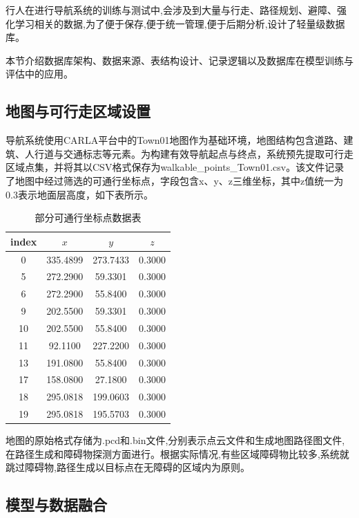 行人在进行导航系统的训练与测试中,会涉及到大量与行走、路径规划、避障、强化学习相关的数据,为了便于保存,便于统一管理,便于后期分析,设计了轻量级数据库。

本节介绍数据库架构、数据来源、表结构设计、记录逻辑以及数据库在模型训练与评估中的应用。

\subsection{地图与可行走区域设置}

导航系统使用CARLA平台中的Town01地图作为基础环境，地图结构包含道路、建筑、人行道与交通标志等元素。为构建有效导航起点与终点，系统预先提取可行走区域点集，并将其以CSV格式保存为walkable\_points\_Town01.csv。该文件记录了地图中经过筛选的可通行坐标点，字段包含x、y、z三维坐标，其中z值统一为0.3表示地面层高度，如下表所示。

\begin{table}[H]
    \centering
    \caption{部分可通行坐标点数据表}
    \label{tab:coord_data}
    \begin{tabular}{cccc}
        \toprule
        index & $x$ & $y$ & $z$ \\
        \midrule
        0 & 335.4899 & 273.7433 & 0.3000 \\
        5 & 272.2900 & 59.3301 & 0.3000 \\
        6 & 272.2900 & 55.8400 & 0.3000 \\
        9 & 202.5500 & 59.3301 & 0.3000 \\
        10 & 202.5500 & 55.8400 & 0.3000 \\
        11 & 92.1100 & 227.2200 & 0.3000 \\
        13 & 191.0800 & 55.8400 & 0.3000 \\
        17 & 158.0800 & 27.1800 & 0.3000 \\
        18 & 295.0818 & 199.0603 & 0.3000 \\
        19 & 295.0818 & 195.5703 & 0.3000 \\
        \bottomrule
    \end{tabular}
\end{table}

地图的原始格式存储为.pcd和.bin文件,分别表示点云文件和生成地图路径图文件,在路径生成和障碍物探测方面进行。根据实际情况,有些区域障碍物比较多,系统就跳过障碍物,路径生成以目标点在无障碍的区域内为原则。

\subsection{模型与数据融合}

